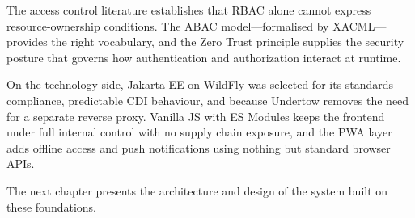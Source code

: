 The access control literature establishes that RBAC alone cannot express resource-ownership conditions. The ABAC model—formalised by XACML—provides the right vocabulary, and the Zero Trust principle supplies the security posture that governs how authentication and authorization interact at runtime.

On the technology side, Jakarta EE on WildFly was selected for its standards compliance, predictable CDI behaviour, and because Undertow removes the need for a separate reverse proxy. Vanilla JS with ES Modules keeps the frontend under full internal control with no supply chain exposure, and the PWA layer adds offline access and push notifications using nothing but standard browser APIs.

The next chapter presents the architecture and design of the system built on these foundations.
